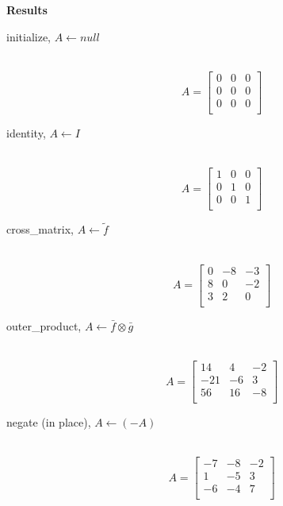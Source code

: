 {\bf Results}
\begin{description}
  \item[initialize, $A \leftarrow null$]\ \newline
   \begin{equation}\nonumber
   A = \left[
   \begin{array}{rrr}
    0 & 0 & 0 \\
    0 & 0 & 0 \\
    0 & 0 & 0 \\
   \end{array}\right]
   \end{equation}

  \item[identity, $A\leftarrow I$]\ \newline
   \begin{equation}\nonumber
   A = \left[
   \begin{array}{rrr}
    1 & 0 & 0 \\
    0 & 1 & 0 \\
    0 & 0 & 1 \\
   \end{array}\right]
   \end{equation}

  \item[cross\_matrix, $A\leftarrow \tilde{f} $]\ \newline
    \begin{equation}\nonumber
    A = \left[
    \begin{array}{rrr}
     0   & -8 & -3 \\
     8   &  0 & -2 \\
     3   &  2 &  0 \\
    \end{array}\right]
    \end{equation}

  \item[outer\_product, $A\leftarrow \bar{f}\otimes\bar{g}$]\ \newline
    \begin{equation}\nonumber
    A = \left[
    \begin{array}{rrr}
     14 &  4  & -2 \\
    -21 & -6  &  3 \\
     56 &  16 & -8 \\
    \end{array}\right]
    \end{equation}

  \item[negate (in place), $A\leftarrow(-A)$]\ \newline
    \begin{equation}\nonumber
    A = \left[
    \begin{array}{rrr}
    -7 & -8  & -2 \\
     1 & -5  &  3 \\
    -6 & -4  &  7 \\
    \end{array}\right]
    \end{equation}


\end{description}
